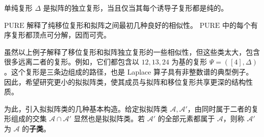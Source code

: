 单纯复形 $\Delta$ 是拟阵的独立复形，当且仅当其每个诱导子复形都是纯的。

$\mathrm{PURE}$ 解释了纯移位复形和拟阵之间最初几种良好的相似性。
$\mathrm{PURE}$ 中的每个有序复形都顶点可分解，因而可壳。

虽然以上例子解释了移位复形和拟阵独立复形的一些相似性，但这些类太大，包含很多远离二者的复形。例如，它们都包含以 $12,13,24$ 为基的复形 $\Psi=([4],\Delta)$。这个复形是三条边组成的路径，也是 Laplace 算子具有非整数谱的典型例子。因此，希望研究更小的拟拟阵类，使其成员与拟阵和移位复形共享更深的结构性质。

为此，引入拟拟阵类的几种基本构造。给定拟拟阵类 $\mathcal A,\mathcal A'$，由同时属于二者的复形组成的交集 $\mathcal A\cap\mathcal A'$ 显然也是拟拟阵类。若 $\mathcal A'$ 的全部元素都属于 $\mathcal A$，则称 $\mathcal A'$ 为 $\mathcal A$ 的\textbf{子类}。
